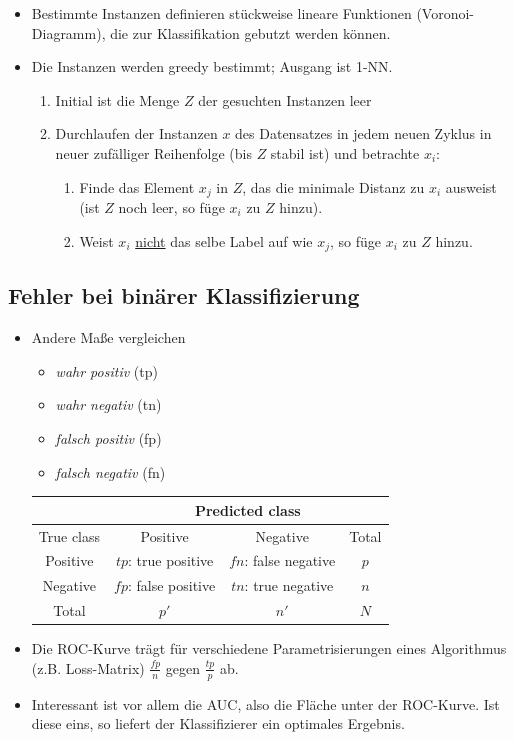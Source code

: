 \documentclass{scrartcl}
\begin{document}
\begin{itemize}
	\item Bestimmte Instanzen definieren stückweise lineare Funktionen 
	(Voronoi-Diagramm), die zur Klassifikation gebutzt werden können.
	\item Die Instanzen werden greedy bestimmt; Ausgang ist 1-NN.
	\begin{enumerate}
		\item Initial ist die Menge $ Z $ der gesuchten Instanzen leer
		\item Durchlaufen der Instanzen $ x $ des Datensatzes in jedem neuen 
		Zyklus in neuer zufälliger Reihenfolge (bis $ Z $ stabil ist) und 
		betrachte $ x_i $:
		\begin{enumerate}
			\item Finde das Element $ x_j $ in $ Z $, das die minimale Distanz 
			zu $ x_i $ ausweist (ist $ Z $ noch leer, so füge $ x_i $ zu $ Z $ 
			hinzu).
			\item Weist $ x_i $ \underline{nicht} das selbe Label auf wie $ x_j 
			$, so füge $ x_i $ zu $ Z $ hinzu.
		\end{enumerate}
	\end{enumerate}
\end{itemize}

\subsection{Fehler bei binärer Klassifizierung}

\begin{itemize}
	\item Andere Maße vergleichen 
	\begin{itemize}
		\item \textit{wahr positiv} (tp)
		\item \textit{wahr negativ} (tn)
		\item \textit{falsch positiv} (fp)
		\item \textit{falsch negativ} (fn)
	\end{itemize}
	\begin{center}
		\begin{tabular}{|c|c|c|c|}
			\hline 
			& \multicolumn{3}{|c|}{Predicted class}  \\ 
			\hline 
			True class & Positive & Negative & Total \\ 
			\hline 
			Positive & $ tp $: true positive & $ fn $: false negative & $ p $ 
			\\ 
			Negative & $ fp $: false positive & $ tn $: true negative & $ n $ 
			\\ 
			\hline 
			Total & $ p' $ & $ n' $ & $ N $ \\ 
			\hline 
		\end{tabular} 
	\end{center}
	\item Die ROC-Kurve trägt für verschiedene Parametrisierungen eines 
	Algorithmus (z.B. Loss-Matrix) $ \frac{fp}{n} $ gegen $ \frac{tp}{p} $ ab.
	\item Interessant ist vor allem die AUC, also die Fläche unter der 
	ROC-Kurve. Ist diese eins, so liefert der Klassifizierer ein optimales 
	Ergebnis.
\end{itemize}
\end{document}
